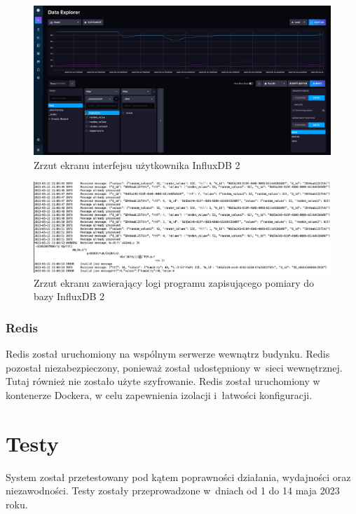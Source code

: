 \begin{figure}[b!]
    \begin{center}
        \includegraphics[width=13cm]{pic/influxdb-web.png}
    \end{center}
    \caption{Zrzut ekranu interfejsu użytkownika InfluxDB 2}\label{rys:influxdb-web}
\end{figure}

\begin{figure}[b!]
    \begin{center}
        \includegraphics[width=13cm]{pic/logi-connector.png}
    \end{center}
    \caption{Zrzut ekranu zawierający logi programu zapisującego pomiary do bazy InfluxDB 2}\label{rys:logi-connector}
\end{figure}

\subsubsection{Redis}
Redis został uruchomiony na wspólnym serwerze wewnątrz budynku.
Redis pozostał niezabezpieczony, ponieważ został udostępniony w~sieci wewnętrznej.
Tutaj również nie zostało użyte szyfrowanie.
Redis został uruchomiony w kontenerze Dockera, w celu zapewnienia izolacji i~łatwości konfiguracji.

\section{Testy}
System został przetestowany pod kątem poprawności działania, wydajności oraz niezawodności.
Testy zostały przeprowadzone w~dniach od 1 do 14 maja 2023 roku.

